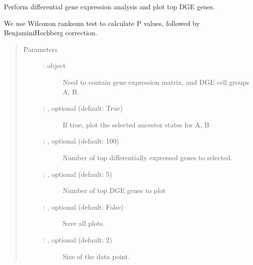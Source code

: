 \documentclass[letterpaper,10pt,english]{sphinxmanual}
\begin{document}
\begin{fulllineitems}
\label{\detokenize{cospar.pl.differential_genes:cospar.pl.differential_genes}}
Perform differential gene expression analysis and plot top DGE genes.

We use Wilcoxon rank\sphinxhyphen{}sum test to calculate P values, followed by
Benjamini\sphinxhyphen{}Hochberg correction.
\begin{quote}\begin{description}
\item[{Parameters}] \leavevmode\begin{description}
\item[{ :  object}] \leavevmode
Need to contain gene expression matrix, and DGE cell groups A, B.

\item[{ : , optional (default: True)}] \leavevmode
If true, plot the selected ancestor states for A, B

\item[{ : , optional (default: 100)}] \leavevmode
Number of top differentially expressed genes to selected.

\item[{ : , optional (default: 5)}] \leavevmode
Number of top DGE genes to plot

\item[{ : , optional (default: False)}] \leavevmode
Save all plots.

\item[{ : , optional (default: 2)}] \leavevmode
Size of the data point.


\end{description}
\end{description}
\end{quote}
\end{fulllineitems}
\end{document}
